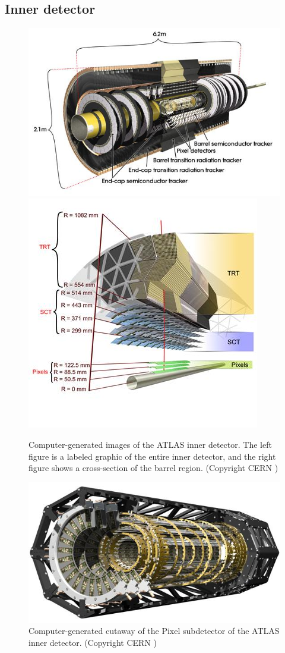 \cite{ATLAS:1998ad} %
\cite{ATLAS:2003aa} %
\cite{Aad:2012xs} %

\subsection{Inner detector}
\label{subsec:atlas_id}

\cite{ATLAS:1997ag,ATLAS:1997af} %
\cite{Aad:2010bx} %

\begin{figure}[t]
\includegraphics[width=0.57\linewidth]{id_whole.jpg}
\includegraphics[width=0.42\linewidth]{id_slice.jpg}
\caption{Computer-generated images of the ATLAS inner detector. The left figure is a labeled graphic of the entire inner detector, and the right figure shows a cross-section of the barrel region. (Copyright CERN \cite{Pequenao:1095926})}
\label{fig:atlas_id}
\end{figure}

\begin{figure}[t]
\includegraphics{pixel.jpg}
\caption{Computer-generated cutaway of the Pixel subdetector of the ATLAS inner detector. (Copyright CERN \cite{Pequenao:1095925})}
\label{fig:atlas_pixel}
\end{figure}

